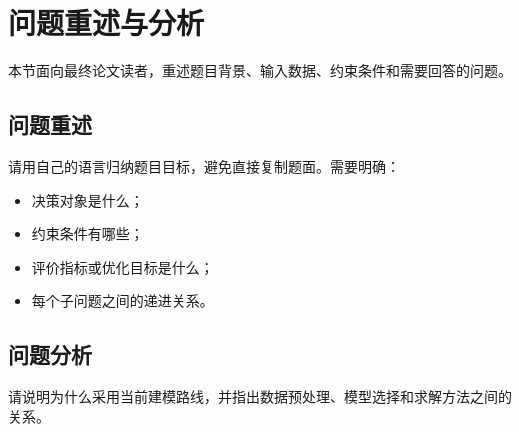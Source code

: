 \section{问题重述与分析}
\label{sec:intro}

本节面向最终论文读者，重述题目背景、输入数据、约束条件和需要回答的问题。

\subsection{问题重述}

请用自己的语言归纳题目目标，避免直接复制题面。需要明确：
\begin{itemize}
  \item 决策对象是什么；
  \item 约束条件有哪些；
  \item 评价指标或优化目标是什么；
  \item 每个子问题之间的递进关系。
\end{itemize}

\subsection{问题分析}

请说明为什么采用当前建模路线，并指出数据预处理、模型选择和求解方法之间的关系。

